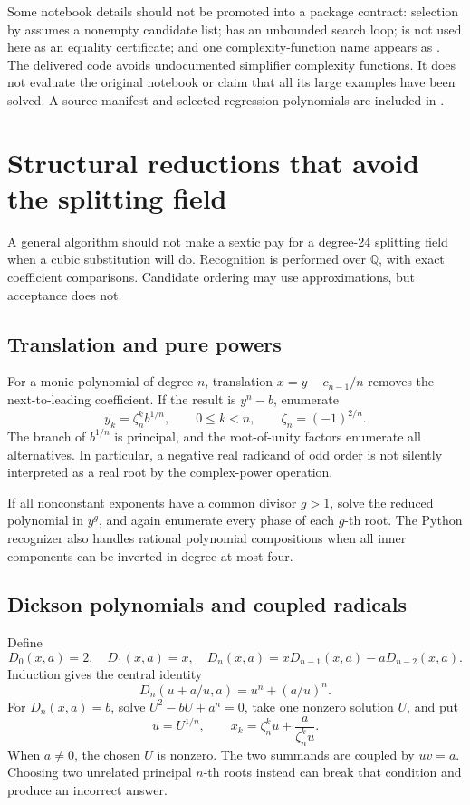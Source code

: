 \documentclass[11pt,letterpaper]{article}
\theoremstyle{definition}\newtheorem{definition}[theorem]{Definition}
\theoremstyle{remark}\newtheorem{remark}[theorem]{Remark}
\newcommand{\Q}{\mathbb Q}\newcommand{\C}{\mathbb C}\newcommand{\Z}{\mathbb Z}
\begin{document}
Some notebook details should not be promoted into a package contract:
selection by \code{[[1]]} assumes a nonempty candidate list;  has an
unbounded search loop;  is not used here as an equality
certificate; and one complexity-function name appears as
. The delivered code avoids undocumented simplifier
complexity functions. It does not evaluate the original notebook or claim that
all its large examples have been solved. A source manifest and selected
regression polynomials are included in .

\section{Structural reductions that avoid the splitting field}
\label{sec:structural}
A general algorithm should not make a sextic pay for a degree-24 splitting
field when a cubic substitution will do. Recognition is performed over
\(\Q\), with exact coefficient comparisons. Candidate ordering may use
approximations, but acceptance does not.

\subsection{Translation and pure powers}
For a monic polynomial of degree \(n\), translation
\(x=y-c_{n-1}/n\) removes the next-to-leading coefficient. If the result is
\(y^n-b\), enumerate
\[
 y_k=\zeta_n^k b^{1/n},\qquad 0\leq k<n,
 \qquad \zeta_n=(-1)^{2/n}.
\]
The branch of \(b^{1/n}\) is principal, and the root-of-unity factors enumerate
all alternatives. In particular, a negative real radicand of odd order is not
silently interpreted as a real root by the complex-power operation.

If all nonconstant exponents have a common divisor \(g>1\), solve the reduced
polynomial in \(y^g\), and again enumerate every phase of each \(g\)-th root.
The Python recognizer also handles rational polynomial compositions when all
inner components can be inverted in degree at most four.

\subsection{Dickson polynomials and coupled radicals}
Define
\[
 D_0(x,a)=2,\quad D_1(x,a)=x,\quad
 D_n(x,a)=xD_{n-1}(x,a)-aD_{n-2}(x,a).
\]
Induction gives the central identity
\begin{equation}
 D_n(u+a/u,a)=u^n+(a/u)^n.\label{eq:dickson}
\end{equation}
For \(D_n(x,a)=b\), solve
\(U^2-bU+a^n=0\), take one nonzero solution \(U\), and put
\[
 u=U^{1/n},\qquad
 x_k=\zeta_n^k u+\frac{a}{\zeta_n^k u}.
\]
When \(a\ne0\), the chosen \(U\) is nonzero. The two summands are coupled by
\(uv=a\). Choosing two unrelated principal \(n\)-th roots instead can break
that condition and produce an incorrect answer.
\end{document}
